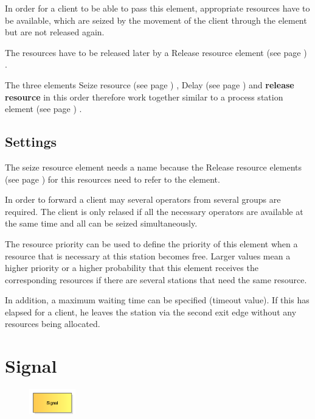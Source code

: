In order for a client to be able to pass this element, appropriate resources have to be available,
which are seized by the movement of the client through the element but are not released again.

The resources have to be released later by a Release resource element (see page \pageref{ref:ModelElementRelease}) .

The three elements Seize resource (see page \pageref{ref:ModelElementSeize}) , Delay (see page \pageref{ref:ModelElementDelay}) and
\textbf{release resource} in this order therefore work together similar to a
process station element (see page \pageref{ref:ModelElementProcess}) .

\subsection*{Settings}

The seize resource element needs a name because the Release resource elements (see page \pageref{ref:ModelElementRelease}) 
for this resources need to refer to the element.

In order to forward a client may several operators from several groups are required.
The client is only relased if all the necessary operators are available at the same
time and all can be seized simultaneously.

The resource priority can be used to define the priority of this element when a resource that
is necessary at this station becomes free. Larger values mean a higher priority or a higher probability
that this element receives the corresponding resources if there are several stations that need the same resource.

In addition, a maximum waiting time can be specified (timeout value). If this has elapsed for a client, he leaves
the station via the second exit edge without any resources being allocated.


\section{Signal}
\label{ref:ModelElementSignal}

\begin{figure}
\vspace{-22pt}
\includegraphics[width=2cm]{imageModelElementSignal.png}
\vspace{-22pt}
\end{figure}


